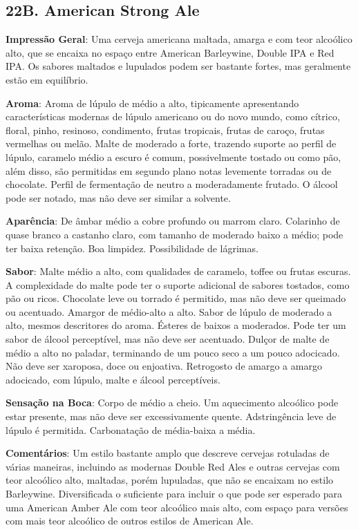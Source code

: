 \subsection*{22B. American Strong Ale}
\textbf{Impressão Geral}: Uma cerveja americana maltada, amarga e com teor alcoólico alto, que se encaixa no espaço entre American Barleywine, Double IPA e Red IPA. Os sabores maltados e lupulados podem ser bastante fortes, mas geralmente estão em equilíbrio.

\textbf{Aroma}: Aroma de lúpulo de médio a alto, tipicamente apresentando características modernas de lúpulo americano ou do novo mundo, como cítrico, floral, pinho, resinoso, condimento, frutas tropicais, frutas de caroço, frutas vermelhas ou melão. Malte de moderado a forte, trazendo suporte ao perfil de lúpulo, caramelo médio a escuro é comum, possivelmente tostado ou como pão, além disso, são permitidas em segundo plano notas levemente torradas ou de chocolate. Perfil de fermentação de neutro a moderadamente frutado. O álcool pode ser notado, mas não deve ser similar a solvente.

\textbf{Aparência}: De âmbar médio a cobre profundo ou marrom claro. Colarinho de quase branco a castanho claro, com tamanho de moderado baixo a médio; pode ter baixa retenção. Boa limpidez. Possibilidade de lágrimas.

\textbf{Sabor}: Malte médio a alto, com qualidades de caramelo, toffee ou frutas escuras. A complexidade do malte pode ter o suporte adicional de sabores tostados, como pão ou ricos. Chocolate leve ou torrado é permitido, mas não deve ser queimado ou acentuado. Amargor de médio-alto a alto. Sabor de lúpulo de moderado a alto, mesmos descritores do aroma. Ésteres de baixos a moderados. Pode ter um sabor de álcool perceptível, mas não deve ser acentuado. Dulçor de malte de médio a alto no paladar, terminando de um pouco seco a um pouco adocicado. Não deve ser xaroposa, doce ou enjoativa. Retrogosto de amargo a amargo adocicado, com lúpulo, malte e álcool perceptíveis.

\textbf{Sensação na Boca}: Corpo de médio a cheio. Um aquecimento alcoólico pode estar presente, mas não deve ser excessivamente quente. Adstringência leve de lúpulo é permitida. Carbonatação de média-baixa a média.

\textbf{Comentários}: Um estilo bastante amplo que descreve cervejas rotuladas de várias maneiras, incluindo as modernas Double Red Ales e outras cervejas com teor alcoólico alto, maltadas, porém lupuladas, que não se encaixam no estilo Barleywine. Diversificada o suficiente para incluir o que pode ser esperado para uma American Amber Ale com teor alcoólico mais alto, com espaço para versões com mais teor alcoólico de outros estilos de American Ale.


